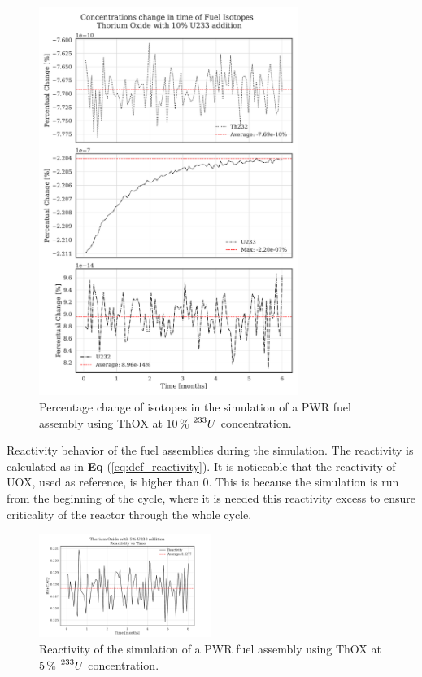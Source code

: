 \begin{figure}[h]
    \centering
    \includegraphics[width=0.75\textwidth, height=0.75\textheight]{Kap7/Figures_Kap7/percentual_change_th232_U233_10.pdf}
    \caption{Percentage change of isotopes in the simulation of a PWR fuel assembly using ThOX at \(10 \, \%\) \(\prescript{233}{}{U}\) concentration.}
    \label{fig:th_u233_10}
\end{figure}


 Reactivity behavior of the fuel assemblies during the simulation. The reactivity is calculated as in \textbf{Eq} (\ref{eq:def_reactivity}). It is noticeable that the reactivity of UOX, used as reference, is higher than \(0\). This is because the simulation is run from the beginning of the cycle, where it is needed this reactivity excess to ensure criticality of the reactor through the whole cycle.

\begin{figure}
    \centering
    \includegraphics[width=0.5\textwidth, scale=0.5]{Kap7/Figures_Kap7/Reactivity_vs_Time_ThOX_U233_5.pdf}
    \caption{Reactivity of the simulation of a PWR fuel assembly using ThOX at \(5 \, \%\) \(\prescript{233}{}{U}\) concentration.}
    \label{fig:reactivity_th_u233_5}
\end{figure}

